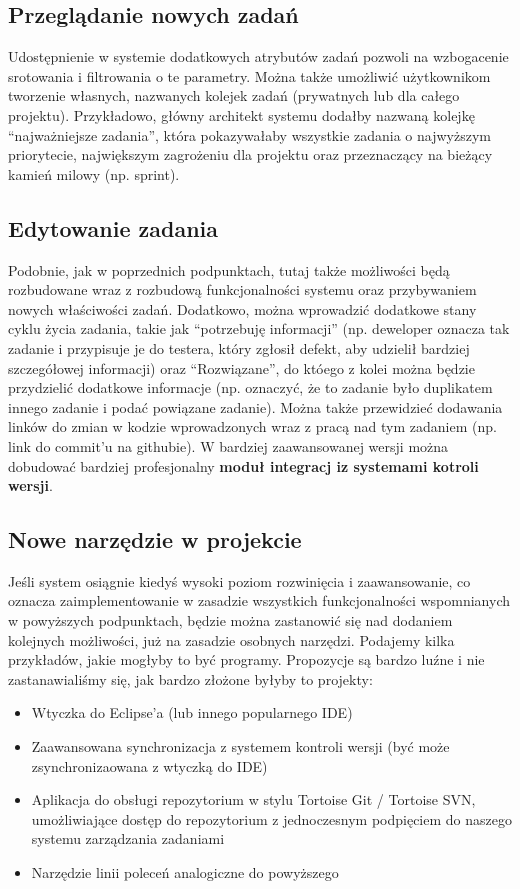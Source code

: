 \documentclass[a4paper,12pt,notitlepage]{mwrep}
\begin{document}
\subsection{Przeglądanie nowych zadań}
Udostępnienie w systemie dodatkowych atrybutów zadań pozwoli na wzbogacenie srotowania i filtrowania
o te parametry. Można także umożliwić użytkownikom tworzenie własnych, nazwanych kolejek zadań
(prywatnych lub dla całego projektu). Przykładowo, główny architekt systemu dodałby nazwaną kolejkę
“najważniejsze zadania”, która pokazywałaby wszystkie zadania o najwyższym priorytecie, największym
zagrożeniu dla projektu oraz przeznaczący na bieżący kamień milowy (np. sprint).


\subsection{Edytowanie zadania}
Podobnie, jak w poprzednich podpunktach, tutaj także możliwości będą rozbudowane wraz z rozbudową
funkcjonalności systemu oraz przybywaniem nowych właściwości zadań. Dodatkowo, można wprowadzić dodatkowe
stany cyklu życia zadania, takie jak “potrzebuję informacji” (np. deweloper oznacza tak zadanie
i przypisuje je do testera, który zgłosił defekt, aby udzielił bardziej szczegółowej informacji)
oraz “Rozwiązane”, do któego z kolei można będzie przydzielić dodatkowe informacje (np. oznaczyć,
że to zadanie było duplikatem innego zadanie i podać powiązane zadanie). Można także przewidzieć
dodawania linków do zmian w kodzie wprowadzonych wraz z pracą nad tym zadaniem (np. link do commit’u
na githubie). W bardziej zaawansowanej wersji można dobudować bardziej profesjonalny \textbf{moduł integracj
iz systemami kotroli wersji}.


\subsection{Nowe narzędzie w projekcie}
Jeśli system osiągnie kiedyś wysoki poziom rozwinięcia i zaawansowanie, co oznacza zaimplementowanie
w zasadzie wszystkich funkcjonalności wspomnianych w powyższych podpunktach, będzie można zastanowić
się nad dodaniem kolejnych możliwości, już na zasadzie osobnych narzędzi. Podajemy kilka przykładów,
jakie mogłyby to być programy. Propozycje są bardzo luźne i nie zastanawialiśmy się, jak bardzo
złożone byłyby to projekty:
\begin{itemize}
	\item	Wtyczka do Eclipse’a (lub innego popularnego IDE)
	\item	Zaawansowana synchronizacja z systemem kontroli wersji (być może zsynchronizaowana z wtyczką do IDE)
	\item	Aplikacja do obsługi repozytorium w stylu Tortoise Git / Tortoise SVN, umożliwiające dostęp do
			repozytorium z jednoczesnym podpięciem do naszego systemu zarządzania zadaniami
	\item	Narzędzie linii poleceń analogiczne do powyższego
\end{itemize}
\end{document}
